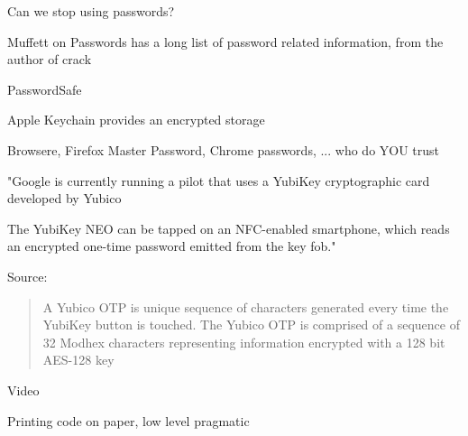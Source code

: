 \documentclass[20pt,landscape,a4paper,footrule]{foils}
\begin{document}
Can we stop using passwords?

Muffett on Passwords has a long list of password related information, from the author of crack 





\begin{list1}
\item PasswordSafe 
\item Apple Keychain provides an encrypted storage
\item Browsere, Firefox Master Password, Chrome passwords, ... who do YOU trust
\end{list1}




"Google is currently running a pilot that uses a YubiKey cryptographic card developed by Yubico

The YubiKey NEO can be tapped on an NFC-enabled smartphone, which reads an encrypted one-time password emitted from the key fob."

{\footnotesize Source:
}


\begin{quote}
A Yubico OTP is unique sequence of characters generated every time the YubiKey button is touched. The Yubico OTP is comprised of a sequence of 32 Modhex characters representing information encrypted with a 128 bit AES-128 key
\end{quote}



Video



\centerline{\Large Printing code on paper, low level pragmatic }
\end{document}
